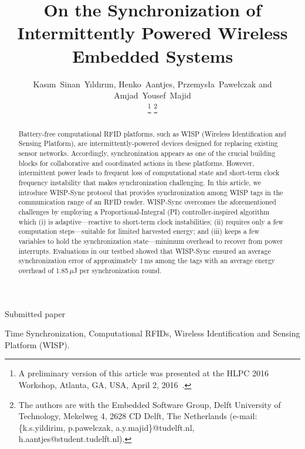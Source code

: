 \documentclass[journal,draftcls,onecolumn,12pt,twoside]{IEEEtranTCOM}
\begin{document}
\title{On the Synchronization of Intermittently Powered Wireless Embedded Systems}

\author{Kas{\i}m~Sinan~Y{\i}ld{\i}r{\i}m, Henko~Aantjes, Przemys{\l}a~Pawe{\l}czak and Amjad~Yousef~Majid

\thanks{A preliminary version of this article was presented at the HLPC 2016 Workshop, Atlanta, GA, USA, April 2, 2016~\cite{hlpc2016}.}
\thanks{The authors are with the Embedded Software Group, Delft University of Technology, Mekelweg 4, 2628 CD Delft, The Netherlands (e-mail: \{k.s.yildirim, p.pawelczak, a.y.majid\}@tudelft.nl, h.aantjes@student.tudelft.nl).}}

%
{Submitted paper}

\maketitle

\vspace{-1cm}

\begin{abstract}
Battery-free computational RFID platforms, such as WISP (Wireless Identification and Sensing Platform), are intermittently-powered devices designed for replacing existing sensor networks. Accordingly, synchronization appears as one of the  crucial building blocks for collaborative and coordinated actions in these platforms. However, intermittent power leads to frequent loss of computational state and short-term clock frequency instability that makes synchronization challenging. In this article, we introduce WISP-Sync protocol that provides synchronization among WISP tags in the communication range of an RFID reader. WISP-Sync overcomes the aforementioned challenges by employing a Proportional-Integral (PI) controller-inspired algorithm which (i) is adaptive---reactive to short-term clock instabilities; (ii) requires only a few computation steps---suitable for limited harvested energy; and (iii) keeps a few variables to hold the synchronization state---minimum overhead to recover from power interrupts.	Evaluations in our testbed showed that WISP-Sync ensured an average synchronization error of approximately 1\,ms among the tags with an average energy overhead of 1.85\,$\mu$J per synchronization round.
\end{abstract}

\begin{IEEEkeywords}Time Synchronization, Computational RFIDs, Wireless Identification and Sensing Platform (WISP).
\end{IEEEkeywords}
\end{document}

